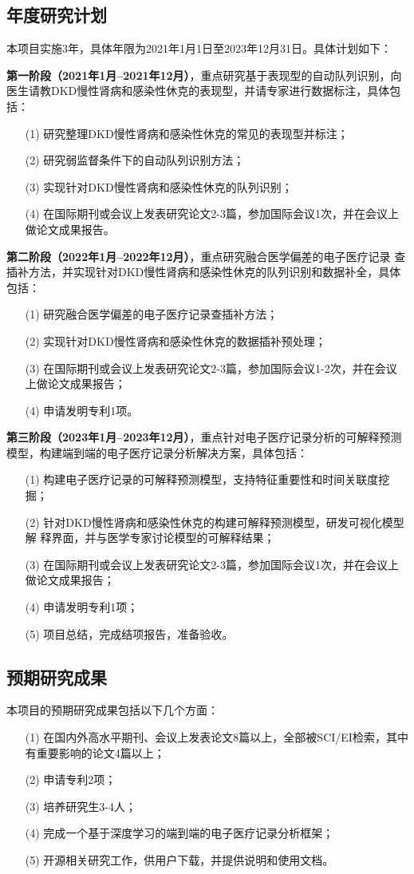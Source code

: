\subsection{年度研究计划}
本项目实施3年，具体年限为2021年1月1日至2023年12月31日。具体计划如下：

\textbf{第一阶段（2021年1月--2021年12月）}，重点研究基于表现型的自动队列识别，向
医生请教DKD慢性肾病和感染性休克的表现型，并请专家进行数据标注，具体包括：
\begin{itemize}[itemindent=2em]
    \item[(1)] 研究整理DKD慢性肾病和感染性休克的常见的表现型并标注；
    \item[(2)] 研究弱监督条件下的自动队列识别方法； 
    \item[(3)] 实现针对DKD慢性肾病和感染性休克的队列识别；
    \item[(4)] 在国际期刊或会议上发表研究论文2-3篇，参加国际会议1次，并在会议上
    做论文成果报告。
\end{itemize}

\textbf{第二阶段（2022年1月--2022年12月）}，重点研究融合医学偏差的电子医疗记录
查插补方法，并实现针对DKD慢性肾病和感染性休克的队列识别和数据补全，具体包括：
\begin{itemize}[itemindent=2em]
    \item[(1)] 研究融合医学偏差的电子医疗记录查插补方法；
    \item[(2)] 实现针对DKD慢性肾病和感染性休克的数据插补预处理；
    \item[(3)] 在国际期刊或会议上发表研究论文2-3篇，参加国际会议1-2次，并在会议
    上做论文成果报告； 
    \item[(4)] 申请发明专利1项。
\end{itemize}

\textbf{第三阶段（2023年1月--2023年12月）}，重点针对电子医疗记录分析的可解释预测
模型，构建端到端的电子医疗记录分析解决方案，具体包括：
\begin{itemize}[itemindent=2em]
    \item[(1)] 构建电子医疗记录的可解释预测模型，支持特征重要性和时间关联度挖
    掘；
    \item[(2)] 针对DKD慢性肾病和感染性休克的构建可解释预测模型，研发可视化模型解
    释界面，并与医学专家讨论模型的可解释结果；
    \item[(3)] 在国际期刊或会议上发表研究论文2-3篇，参加国际会议1次，并在会议上
    做论文成果报告； 
    \item[(4)] 申请发明专利1项；
    \item[(5)] 项目总结，完成结项报告，准备验收。 
\end{itemize}

\subsection{预期研究成果}

本项目的预期研究成果包括以下几个方面：
\begin{itemize}[itemindent=2em]
    \item[(1)] 在国内外高水平期刊、会议上发表论文8篇以上，全部被SCI/EI检索，其中
    有重要影响的论文4篇以上；
    \item[(2)] 申请专利2项；
    \item[(3)] 培养研究生3-4人； 
    \item[(4)] 完成一个基于深度学习的端到端的电子医疗记录分析框架；
    \item[(5)] 开源相关研究工作，供用户下载，并提供说明和使用文档。
\end{itemize}
